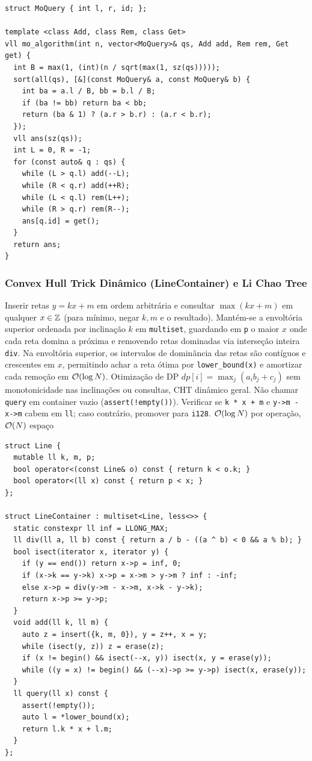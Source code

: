 \begin{lstlisting}
struct MoQuery { int l, r, id; };

template <class Add, class Rem, class Get>
vll mo_algorithm(int n, vector<MoQuery>& qs, Add add, Rem rem, Get get) {
  int B = max(1, (int)(n / sqrt(max(1, sz(qs)))));
  sort(all(qs), [&](const MoQuery& a, const MoQuery& b) {
    int ba = a.l / B, bb = b.l / B;
    if (ba != bb) return ba < bb;
    return (ba & 1) ? (a.r > b.r) : (a.r < b.r);
  });
  vll ans(sz(qs));
  int L = 0, R = -1;
  for (const auto& q : qs) {
    while (L > q.l) add(--L);
    while (R < q.r) add(++R);
    while (L < q.l) rem(L++);
    while (R > q.r) rem(R--);
    ans[q.id] = get();
  }
  return ans;
}
\end{lstlisting}

\subsubsection{Convex Hull Trick Dinâmico (LineContainer) e Li Chao Tree}
\algobox
  {Inserir retas $y = kx + m$ em ordem arbitrária e consultar $\max(kx + m)$ em qualquer $x \in \mathbb{Z}$ (para mínimo, negar $k, m$ e o resultado).}
  {Mantém-se a envoltória superior ordenada por inclinação $k$ em \texttt{multiset}, guardando em \texttt{p} o maior $x$ onde cada reta domina a próxima e removendo retas dominadas via interseção inteira \texttt{div}.}
  {Na envoltória superior, os intervalos de dominância das retas são contíguos e crescentes em $x$, permitindo achar a reta ótima por \texttt{lower\_bound(x)} e amortizar cada remoção em $\mathcal{O}(\log N)$.}
  {Otimização de DP $dp[i] = \max_j(a_i b_j + c_j)$ sem monotonicidade nas inclinações ou consultas, CHT dinâmico geral.}
  {Não chamar \texttt{query} em container vazio (\texttt{assert(!empty())}). Verificar se \texttt{k * x + m} e \texttt{y->m - x->m} cabem em \texttt{ll}; caso contrário, promover para \texttt{i128}.}
  {$\mathcal{O}(\log N)$ por operação, $\mathcal{O}(N)$ espaço}

\begin{lstlisting}
struct Line {
  mutable ll k, m, p;
  bool operator<(const Line& o) const { return k < o.k; }
  bool operator<(ll x) const { return p < x; }
};

struct LineContainer : multiset<Line, less<>> {
  static constexpr ll inf = LLONG_MAX;
  ll div(ll a, ll b) const { return a / b - ((a ^ b) < 0 && a % b); }
  bool isect(iterator x, iterator y) {
    if (y == end()) return x->p = inf, 0;
    if (x->k == y->k) x->p = x->m > y->m ? inf : -inf;
    else x->p = div(y->m - x->m, x->k - y->k);
    return x->p >= y->p;
  }
  void add(ll k, ll m) {
    auto z = insert({k, m, 0}), y = z++, x = y;
    while (isect(y, z)) z = erase(z);
    if (x != begin() && isect(--x, y)) isect(x, y = erase(y));
    while ((y = x) != begin() && (--x)->p >= y->p) isect(x, erase(y));
  }
  ll query(ll x) const {
    assert(!empty());
    auto l = *lower_bound(x);
    return l.k * x + l.m;
  }
};
\end{lstlisting}


